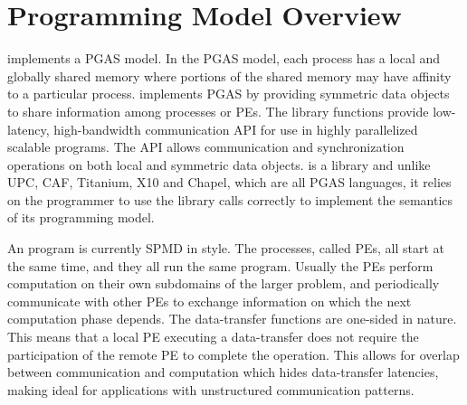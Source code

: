 \section{Programming Model Overview}

\openshmem implements a \ac{PGAS} model. In the \ac{PGAS} model, each process has a local and 
globally shared memory where portions of the shared memory may have affinity to a particular process. 
\openshmem implements \ac{PGAS} by providing symmetric data objects to share information among processes or \ac{PE}s. 
The \openshmem  library functions provide low-latency, high-bandwidth communication \ac{API} for  use  in  highly  parallelized 
scalable programs. The \ac{API} allows communication and synchronization operations on both local and symmetric data objects. 
\openshmem is a library and unlike UPC, CAF, Titanium, X10 and Chapel, which are all
PGAS languages, it relies on the programmer to use the library calls correctly to implement the semantics of its programming model.

An \openshmem program is currently \ac{SPMD} in style. The
\openshmem  processes, called \ac{PE}s, all start at the
same time, and they all run the same program.  Usually the \ac{PE}s  perform
computation on their own subdomains of the larger problem, and periodically 
communicate with other \ac{PE}s to exchange information on which the
next computation phase depends.
The \openshmem data-transfer functions are one-sided in nature. This means that a local \ac{PE} executing a data-transfer does not require the participation of the remote \ac{PE} to complete the operation. This allows for overlap between communication and computation which hides data-transfer latencies, making \openshmem ideal for applications with unstructured communication patterns.

